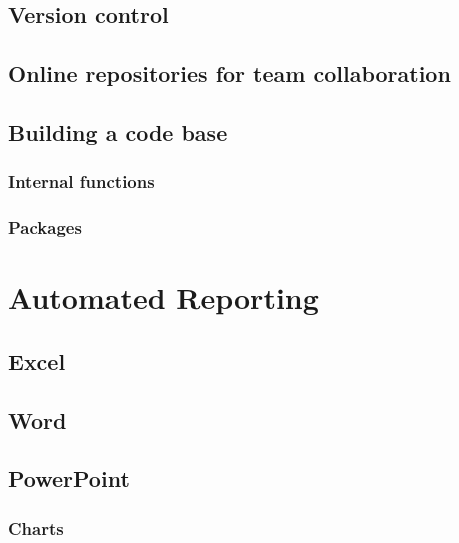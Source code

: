 \documentclass[
]{book}
\begin{document}
\hypertarget{version-control}{%
\section{Version control}\label{version-control}}

\hypertarget{online-repositories-for-team-collaboration}{%
\section{Online repositories for team collaboration}\label{online-repositories-for-team-collaboration}}

\hypertarget{building-a-code-base}{%
\section{Building a code base}\label{building-a-code-base}}

\hypertarget{internal-functions}{%
\subsection{Internal functions}\label{internal-functions}}

\hypertarget{packages}{%
\subsection{Packages}\label{packages}}

\hypertarget{auto_report}{%
\chapter{Automated Reporting}\label{auto_report}}

\hypertarget{excel}{%
\section{Excel}\label{excel}}

\hypertarget{word}{%
\section{Word}\label{word}}

\hypertarget{powerpoint}{%
\section{PowerPoint}\label{powerpoint}}

\hypertarget{charts}{%
\subsection{Charts}\label{charts}}
\end{document}

